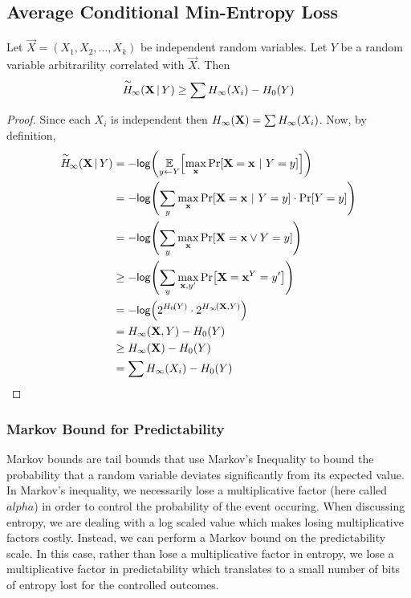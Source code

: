 \subsection{Average Conditional Min-Entropy Loss}
\begin{lemma}
    \label{lem:conditionalminentloss}
    Let $\vec{X} = (X_1, X_2, \ldots, X_k)$ be independent random variables. 
    Let $Y$ be a random variable arbitrarility correlated with $\vec{X}$. 
    Then 
    \[
        \overset{\sim}{H}\!_{\infty}\!\left(\mathbf{X}\,|\,Y\right) \geq \sum H_{\infty}\!\left(X_i\right) - H_0\!\left(Y\right)
    \]
\end{lemma} 

\begin{proof}
    Since each $X_i$ is independent then $H_{\infty}\!\left(\mathbf{X}\right) = \sum H_{\infty}\!\left(X_i\right)$.
    Now, by definition,
    \begin{align*}
        \acminent{\vec{X}}{Y} &= -\log{\Exlim{y \leftarrow Y}{\max\limits_{\vec{x}} \Prob{\Vec{X} = \vec{x}\ |\ Y = y}}} \\
        &= -\log{\sum\limits_{y} \max\limits_{\vec{x}} \Prob{\vec{X} = \vec{x} \ |\ Y = y} \cdot \Prob{Y = y}}\\
        &= -\log{\sum\limits_{y} \max\limits_{\vec{x}} \Prob{\vec{X} = \vec{x} \vee Y = y}}\\
        &\geq -\log{\sum\limits_{y} \max\limits_{\vec{x}, y'} \Prob{\vec{X} = \vec{x}  ^ Y = y'}}\\
        &= -\log{2^{\hart{Y}} \cdot 2^{\minent{\vec{X},Y}}}\\
        &= \minent{\vec{X},Y} - \hart{Y}\\
        &\geq \minent{\vec{X}} - \hart{Y} \\   
        &= \sum \minent{X_i} - \hart{Y}
    \end{align*}
\end{proof}

\subsubsection{Markov Bound for Predictability}
Markov bounds are tail bounds that use Markov's Inequality to bound the probability that a random variable deviates significantly from its expected value. In Markov's inequality, we necessarily lose a multiplicative factor (here called $alpha$) in order to control the probability of the event occuring. When discussing entropy, we are dealing with a log scaled value which makes losing multiplicative factors costly. Instead, we can perform a Markov bound on the predictability scale. In this case, rather than lose a multiplicative factor in entropy, we lose a multiplicative factor in predictability which translates to a small number of bits of entropy lost for the controlled outcomes.

